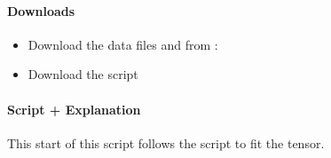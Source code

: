 \documentclass[a4paper,10pt,english,openany,oneside]{sphinxmanual}
\begin{document}
\paragraph{Downloads}
\label{\detokenize{examples/pcs_fit_uncertainty:downloads}}\begin{itemize}
\item {} 
Download the data files  and  from :

\item {} 
Download the script 

\end{itemize}


\paragraph{Script + Explanation}
\label{\detokenize{examples/pcs_fit_uncertainty:script-explanation}}
This start of this script follows the script {\hyperref[\detokenize{examples/pcs_fit:pcs-fit}]{}} to fit the tensor.
\end{document}
